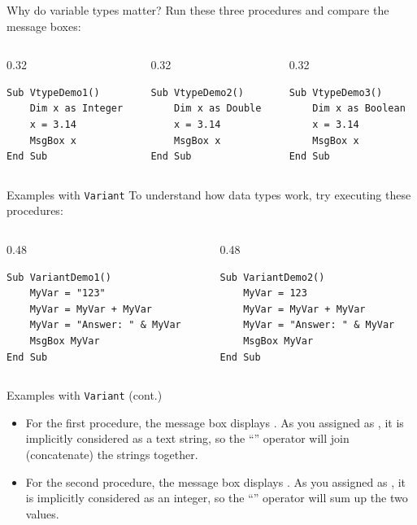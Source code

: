 \documentclass{beamer}
\begin{document}
\begin{frame}[fragile]{Why do variable types matter?}
Run these three procedures and compare the message boxes:
\begin{columns}[T]
\begin{column}{0.32\textwidth}
\begin{lstlisting}[language=VBA]
Sub VtypeDemo1()
    Dim x as Integer
    x = 3.14
    MsgBox x
End Sub
\end{lstlisting}
\end{column}
\begin{column}{0.32\textwidth}
\begin{lstlisting}[language=VBA]
Sub VtypeDemo2()
    Dim x as Double
    x = 3.14
    MsgBox x
End Sub
\end{lstlisting}
\end{column}
\begin{column}{0.32\textwidth}
\begin{lstlisting}[language=VBA]
Sub VtypeDemo3()
    Dim x as Boolean
    x = 3.14
    MsgBox x
End Sub
\end{lstlisting}
\end{column}
\end{columns}
\end{frame}

\begin{frame}[fragile]{Examples with \texttt{Variant}}
To understand how  data types work, try executing these procedures:
\begin{columns}[T]
\begin{column}{0.48\textwidth}
\begin{lstlisting}[language=VBA]
Sub VariantDemo1()
    MyVar = "123"
    MyVar = MyVar + MyVar
    MyVar = "Answer: " & MyVar
    MsgBox MyVar
End Sub
\end{lstlisting}
\end{column}
\begin{column}{0.48\textwidth}
\begin{lstlisting}[language=VBA]
Sub VariantDemo2()
    MyVar = 123
    MyVar = MyVar + MyVar
    MyVar = "Answer: " & MyVar
    MsgBox MyVar
End Sub
\end{lstlisting}
\end{column}
\end{columns}
\end{frame}

\begin{frame}{Examples with \texttt{Variant} (cont.)}
\begin{itemize}
  \item For the first procedure, the message box displays .
        As you assigned  as , it is implicitly considered as a text
        string, so the ``\code{+}'' operator will join (concatenate) the strings together.
  \vspace{0.6em}
  \item For the second procedure, the message box displays .
        As you assigned  as , it is implicitly considered as an integer,
        so the ``\code{+}'' operator will sum up the two values.
\end{itemize}
\end{frame}
\end{document}
